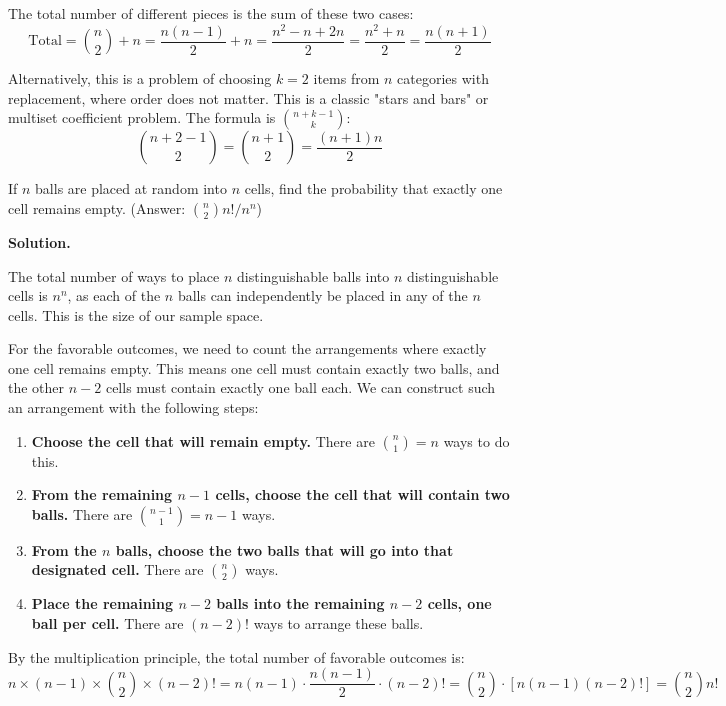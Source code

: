 The total number of different pieces is the sum of these two cases:
\[ \text{Total} = \binom{n}{2} + n = \frac{n(n-1)}{2} + n = \frac{n^2 - n + 2n}{2} = \frac{n^2+n}{2} = \frac{n(n+1)}{2} \]

Alternatively, this is a problem of choosing $k=2$ items from $n$ categories with replacement, where order does not matter. This is a classic "stars and bars" or multiset coefficient problem. The formula is $\binom{n+k-1}{k}$:
\[ \binom{n+2-1}{2} = \binom{n+1}{2} = \frac{(n+1)n}{2} \]


\begin{problembox}
If $n$ balls are placed at random into $n$ cells, find the probability that exactly one cell remains empty.
(Answer: $\binom{n}{2}n!/n^{n}$)
\end{problembox}

\noindent\textbf{Solution.}

The total number of ways to place $n$ distinguishable balls into $n$ distinguishable cells is $n^n$, as each of the $n$ balls can independently be placed in any of the $n$ cells. This is the size of our sample space.

For the favorable outcomes, we need to count the arrangements where exactly one cell remains empty. This means one cell must contain exactly two balls, and the other $n-2$ cells must contain exactly one ball each. We can construct such an arrangement with the following steps:

\begin{enumerate}
    \item \textbf{Choose the cell that will remain empty.} There are $\binom{n}{1} = n$ ways to do this.
    \item \textbf{From the remaining $n-1$ cells, choose the cell that will contain two balls.} There are $\binom{n-1}{1} = n-1$ ways.
    \item \textbf{From the $n$ balls, choose the two balls that will go into that designated cell.} There are $\binom{n}{2}$ ways.
    \item \textbf{Place the remaining $n-2$ balls into the remaining $n-2$ cells, one ball per cell.} There are $(n-2)!$ ways to arrange these balls.
\end{enumerate}

By the multiplication principle, the total number of favorable outcomes is:
\[ n \times (n-1) \times \binom{n}{2} \times (n-2)! = n(n-1) \cdot \frac{n(n-1)}{2} \cdot (n-2)! = \binom{n}{2} \cdot [n(n-1)(n-2)!] = \binom{n}{2} n! \]

